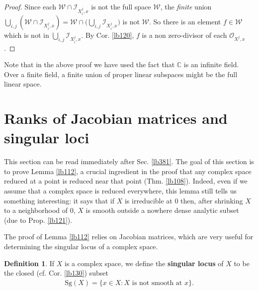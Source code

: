 \documentclass[12pt,b5paper,notitlepage]{report}
\theoremstyle{definition}
\newtheorem{df}{Definition}[section]
\theoremstyle{plain}
\newcommand{\scr}{\mathscr}
\newcommand{\Cbb}{\mathbb C}
\newcommand{\Sg}{\mathrm{Sg}}
\numberwithin{equation}{section}
\begin{document}
\begin{proof}
Since each $\scr W\cap \scr I_{X^j_i,x}$ is not the full space $\scr W$, the \emph{finite} union $\bigcup_{i,j} (\scr W\cap\scr I_{X_i^j,x})=\scr W\cap \big(\bigcup_{i,j}\scr I_{X_i^j,x}\big)$ is not $\scr W$. So there is an element $f\in\scr W$ which is not in $\bigcup_{i,j}\scr I_{X_i^j,x}$. By Cor. \ref{lb120}, $f$ is a non zero-divisor of each $\scr O_{X^j,x}$.
\end{proof}

Note that in the above proof we have used the fact that $\Cbb$ is an infinite field. Over a finite field, a finite union of proper linear subspaces might be the full linear space.

























\section{Ranks of Jacobian matrices and singular loci}\label{lb119}



This section can be read immediately after Sec. \ref{lb381}. The goal of this section is to prove Lemma \ref{lb112}, a crucial ingredient in the proof that any complex space reduced at a point is reduced near that point (Thm. \ref{lb108}). Indeed, even if we assume that a complex space is reduced everywhere, this lemma still tells us something interesting: it says that if $X$ is irreducible at $0$ then, after shrinking $X$ to a neighborhood of $0$, $X$ is smooth outside a nowhere dense analytic subset (due to Prop. \ref{lb121}). 

The proof of Lemma \ref{lb112} relies on Jacobian matrices, which are very useful for determining the singular locus of a complex space.


\begin{df}
If $X$ is a complex space, we define the \textbf{singular locus} of $X$ \index{00@Singular locus $\Sg(X)$} to be the closed (cf. Cor. \ref{lb130}) subset 
\begin{align*}
\Sg(X)=\{x\in X:X\text{ is not smooth at }x\}.
\end{align*}
\end{df}
\end{document}

